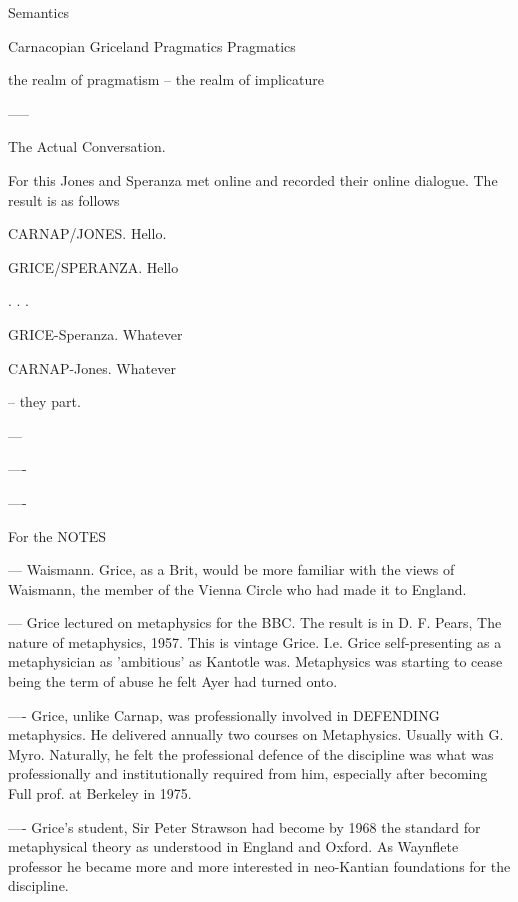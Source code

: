 \documentclass[10pt,titlepage]{book}
\begin{document}
                   Semantics
 
 
Carnacopian                        Griceland
Pragmatics                       Pragmatics
 
the realm 
of 
pragmatism                                -- the realm of implicature
 
 
 
 
-----
 
The Actual Conversation.
 
For this Jones and Speranza
met online and recorded their online
dialogue. The result is as follows
 
 
CARNAP/JONES. Hello.
 
GRICE/SPERANZA. Hello
 
.
.
.
 
 
 
 
 
GRICE-Speranza. Whatever
 
CARNAP-Jones. Whatever
 
             --  they part.
 
---
 
----
 
 
----
 
 
For the NOTES
 
 
--- Waismann. Grice, as a Brit, would be more familiar with the views of  
Waismann, the member of the Vienna Circle who had made it to England. 
 
--- Grice lectured on metaphysics for the BBC. The result is in D. F.  
Pears, The nature of metaphysics, 1957. This is vintage Grice. I.e. Grice  
self-presenting as a metaphysician as 'ambitious' as Kantotle was. Metaphysics  
was starting to cease being the term of abuse he felt Ayer had turned  onto.

  
---- Grice, unlike Carnap, was professionally involved in DEFENDING  
metaphysics. He delivered annually two courses on Metaphysics. Usually with G.  
Myro. Naturally, he felt the professional defence of the discipline was what 
was  professionally and institutionally required from him, especially after 
becoming  Full prof. at Berkeley in 1975. 
 
---- Grice's student, Sir Peter Strawson had become by 1968 the standard  
for metaphysical theory as understood in England and Oxford. As Waynflete  
professor he became more and more interested in neo-Kantian foundations for 
the  discipline.
 
\end{document}
